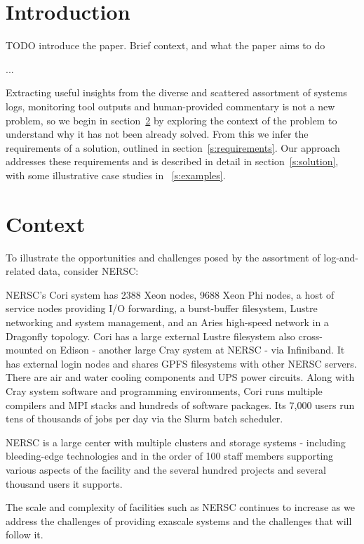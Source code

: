 \section{Introduction}
\label{s:intro}

TODO introduce the paper. Brief context, and what the paper aims to do

...

Extracting useful insights from the diverse and scattered assortment of systems 
logs, monitoring tool outputs and human-provided commentary is not a new 
problem, so we begin in section~\ref{s:context} by exploring the context of the
problem to understand why it has not been already solved. From this we infer 
the requirements of a solution, outlined in section~\ref{s:requirements}. Our 
approach addresses these requirements and is described in detail in 
section~\ref{s:solution}, with some illustrative case studies in 
~\ref{s:examples}.


\section{Context}
\label{s:context}

To illustrate the opportunities and challenges posed by the assortment of 
log-and-related data, consider NERSC:

NERSC's Cori system has 2388 Xeon nodes, 9688 Xeon Phi nodes, a host of service 
nodes providing I/O forwarding, a burst-buffer filesystem, Lustre networking and
system management, and an Aries high-speed network in a Dragonfly topology. Cori
has a large external Lustre filesystem also cross-mounted on Edison - another 
large Cray system at NERSC - via Infiniband. It has external login nodes and 
shares GPFS filesystems with other NERSC servers. There are air and water cooling
components and UPS power circuits. Along with Cray system software and 
programming environments, Cori runs multiple compilers and MPI stacks and
hundreds of software packages. Its 7,000 users run tens of thousands of jobs per 
day via the Slurm batch scheduler.

NERSC is a large center with multiple clusters and storage systems - including 
bleeding-edge technologies and in the order of 100 staff members supporting 
various aspects of the facility and the several hundred projects and several 
thousand users it supports.

The scale and complexity of facilities such as NERSC continues to increase as 
we address the challenges of providing exascale systems and the challenges that 
will follow it.

